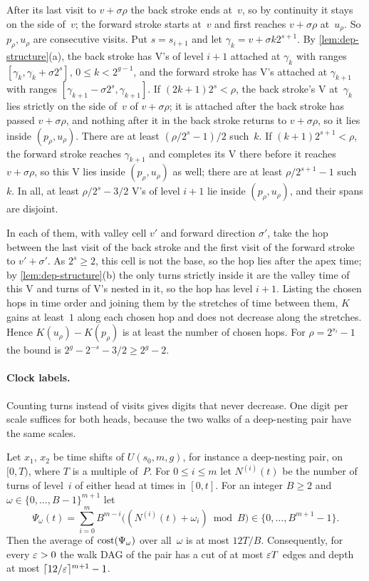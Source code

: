 \begin{informalproof}
After its last visit to $v+\sigma\rho$ the back stroke ends at~$v$, so by continuity it stays on the side of~$v$; the
forward stroke starts at~$v$ and first reaches $v+\sigma\rho$ at~$u_\rho$. So $p_\rho,u_\rho$ are consecutive visits.
Put $s=s_{i+1}$ and let $\gamma_k=v+\sigma k2^{s+1}$. By \cref{lem:dep-structure}(a), the back stroke has V's of
level $i+1$ attached at $\gamma_k$ with ranges $[\gamma_k,\gamma_k+\sigma2^s]$, $0\le k<2^{g-1}$, and the forward
stroke has V's attached at $\gamma_{k+1}$ with ranges $[\gamma_{k+1}-\sigma2^s,\gamma_{k+1}]$. If
$(2k+1)2^s<\rho$, the back stroke's V at~$\gamma_k$ lies strictly on the side of~$v$ of $v+\sigma\rho$; it is
attached after the back stroke has passed $v+\sigma\rho$, and nothing after it in the back stroke returns to
$v+\sigma\rho$, so it lies inside $(p_\rho,u_\rho)$. There are at least $(\rho/2^s-1)/2$ such~$k$. If
$(k+1)2^{s+1}<\rho$, the forward stroke reaches $\gamma_{k+1}$ and completes its V there before it reaches
$v+\sigma\rho$, so this V lies inside $(p_\rho,u_\rho)$ as well; there are at least $\rho/2^{s+1}-1$ such~$k$. In all,
at least $\rho/2^s-3/2$ V's of level $i+1$ lie inside $(p_\rho,u_\rho)$, and their spans are disjoint.

In each of them, with valley cell $v'$ and forward direction $\sigma'$, take the hop between the last visit of the back
stroke and the first visit of the forward stroke to $v'+\sigma'$. As $2^s\ge2$, this cell is not the base, so the hop
lies after the apex time; by \cref{lem:dep-structure}(b) the only turns strictly inside it are the valley time of this
V and turns of V's nested in it, so the hop has level $i+1$. Listing the chosen hops in time order and joining them by
the stretches of time between them, $K$ gains at least~$1$ along each chosen hop and does not decrease along the
stretches. Hence $K(u_\rho)-K(p_\rho)$ is at least the number of chosen hops. For $\rho=2^{s_i}-1$ the bound is
$2^g-2^{-s}-3/2\ge2^g-2$.
\end{informalproof}

\paragraph{Clock labels.} Counting turns instead of visits gives digits that never decrease. One digit per scale
suffices for both heads, because the two walks of a deep-nesting pair have the same scales.

\begin{proposition}\label{prop:dep-clock}
\notformalized
Let $x_1$, $x_2$ be time shifts of $U(s_0,m,g)$, for instance a deep-nesting pair, on $[0,T)$, where $T$ is a multiple
of~$P$. For $0\le i\le m$ let $N^{(i)}(t)$ be the number of turns of level~$i$ of either head at times in $[0,t]$.
For an
integer $B\ge2$ and $\omega\in\{0,\dots,B-1\}^{m+1}$ let
\[
  \Psi_\omega(t)=\sum_{i=0}^{m}B^{m-i}\bigl((N^{(i)}(t)+\omega_i)\bmod B\bigr)\in\{0,\dots,B^{m+1}-1\}.
\]
Then the average of $\mathrm{cost}(\Psi_\omega)$ over all~$\omega$ is at most $12T/B$. Consequently, for every $\varepsilon>0$ the walk
DAG of the pair has a cut of at most $\varepsilon T$ edges and depth at most $\lceil12/\varepsilon\rceil^{m+1}-1$.
\end{proposition}

